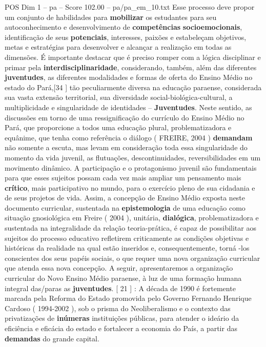 \begin{textsample}{POS Dim 1 – pa – Score 102.00 – pa/pa\_em\_10.txt}
Esse processo deve propor um conjunto de habilidades para \textbf{mobilizar} os estudantes para seu autoconhecimento e desenvolvimento de \textbf{competências} \textbf{socioemocionais}, identificação de seus \textbf{potenciais}, interesses, paixões e estabeleçam objetivos, metas e estratégias para desenvolver e alcançar a realização em todas as dimensões.
É importante destacar que é preciso romper com a lógica disciplinar e primar pela \textbf{interdisciplinaridade}, considerando, também, além das diferentes \textbf{juventudes}, as diferentes modalidades e formas de oferta do Ensino Médio no estado do Pará,[34 ] tão peculiarmente diversa na educação paraense, considerada sua vasta extensão territorial, sua diversidade social-biológica-cultural, a multiplicidade e singularidade de identidades – \textbf{Juventudes}.
Neste sentido, as discussões em torno de uma ressignificação do currículo do Ensino Médio no Pará, que proporcione a todos uma educação plural, problematizadora e equânime, que tenha como referência o diálogo ( FREIRE, 2004 ) \textbf{demandam} não somente a escuta, mas levam em consideração toda essa singularidade do momento da vida juvenil, as flutuações, descontinuidades, reversibilidades em um movimento dinâmico.
A participação e o protagonismo juvenil são fundamentais para que esses sujeitos possam cada vez mais ampliar um pensamento mais \textbf{crítico}, mais participativo no mundo, para o exercício pleno de sua cidadania e de seus projetos de vida.
Assim, a concepção de Ensino Médio exposta neste documento curricular, sustentada na \textbf{epistemologia} de uma educação como situação gnosiológica em Freire ( 2004 ), unitária, \textbf{dialógica}, problematizadora e sustentada na integralidade da relação teoria-prática, é capaz de possibilitar aos sujeitos do processo educativo refletirem criticamente as condições objetivas e históricas da realidade na qual estão inseridos e, consequentemente, torná -los conscientes dos seus papéis sociais, o que requer uma nova organização curricular que atenda essa nova concepção.
A seguir, apresentaremos a organização curricular do Novo Ensino Médio paraense, à luz de uma formação humana integral das/paras as \textbf{juventudes}. [ 21 ] : A década de 1990 é fortemente marcada pela Reforma do Estado promovida pelo Governo Fernando Henrique Cardoso ( 1994-2002 ), sob o prisma do Neoliberalismo e o contexto das privatizações de \textbf{inúmeras} instituições públicas, para atender o ideário da eficiência e eficácia do estado e fortalecer a economia do País, a partir das \textbf{demandas} do grande capital.

\end{textsample}
